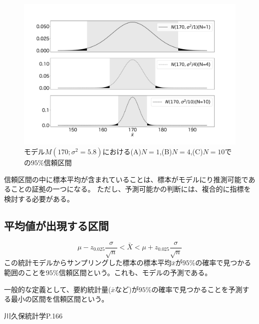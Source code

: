 \begin{figure}
\begin{center}
    \includegraphics[width=15cm]{./image/03_/confidence_interval.pdf}
    \caption{モデル$M(170;\sigma^2=5.8)$における(A)$N=1$,(B)$N=4$,(C)$N=10$での$95\%$信頼区間}
    \label{fig:confidence_interval_n}
    \end{center}
\end{figure}


信頼区間の中に標本平均が含まれていることは、標本がモデルにり推測可能であることの証拠の一つになる。
ただし、予測可能かの判断には、複合的に指標を検討する必要がある。

\subsection{平均値が出現する区間}
\begin{equation*}
    \mu - z_{0.025} \frac{\sigma}{\sqrt{n}} < \bar{X} < \mu + z_{0.025} \frac{\sigma}{\sqrt{n}}
\end{equation*}
この統計モデルからサンプリングした標本の標本平均$\bar{x}$が$95\%$の確率で見つかる範囲のことを$95\%$信頼区間という。これも、モデルの予測である。

一般的な定義として、要約統計量($\bar{x}$など)が$95\%$の確率で見つかることを予測する最小の区間を信頼区間という。

\fi

 川久保統計学P.166
 \fi





